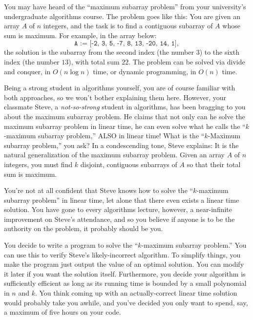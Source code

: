 


You may have heard of the ``maximum subarray problem'' from your university's undergraduate algorithms course. The problem goes like this: You are given an array $A$ of $n$ integers, and the task is to find a contiguous subarray of $A$ whose sum is maximum. For example, in the array below:
\[
\texttt{A := [-2, 3, 5, -7, 8, 13, -20, 14, 1]},
\]
the solution is the subarray from the second index (the number $3$) to the sixth index (the number $13$), with total sum $22$. The problem can be solved via divide and conquer, in $O(n \log n)$ time, or dynamic programming, in $O(n)$ time.

Being a strong student in algorithms yourself, you are of course familiar with both approaches, so we won't bother explaining them here. However, your classmate Steve, a \textit{not-so-strong} student in algorithms, has been bragging to you about the maximum subarray problem. He claims that not only can he solve the maximum subarray problem in linear time, he can even solve what he calls the ``$k$-maximum subarray problem,'' ALSO in linear time! What is the ``$k$-Maximum subarray problem,'' you ask? In a condescending tone, Steve explains: It is the natural generalization of the maximum subarray problem. Given an array $A$ of $n$ integers, you must find $k$ disjoint, contiguous subarrays of $A$ so that their total sum is maximum.

You're not at all confident that Steve knows how to solve the ``$k$-maximum subarray problem'' in linear time, let alone that there even exists a linear time solution. You have gone to every algorithms lecture, however, a near-infinite improvement on Steve's attendance, and so you believe if anyone is to be the authority on the problem, it probably should be you.

You decide to write a program to solve the ``$k$-maximum subarray problem.'' You can use this to verify Steve's likely-incorrect algorithm. To simplify things, you make the program just output the value of an optimal solution. You can modify it later if you want the solution itself. Furthermore, you decide your algorithm is sufficiently efficient as long as its running time is bounded by a small polynomial in $n$ and $k$. You think coming up with an actually-correct linear time solution would probably take you awhile, and you've decided you only want to spend, say, a maximum of five hours on your code.

